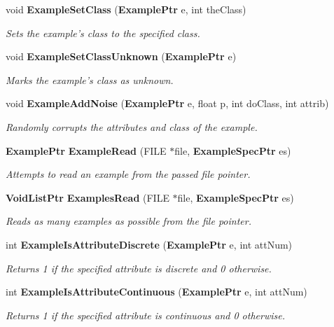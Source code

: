 \begin{CompactItemize}
void {\bf Example\-Set\-Class} ({\bf Example\-Ptr} e, int the\-Class)
\begin{CompactList}\small\item\em Sets the example's class to the specified class. \item\end{CompactList}\item 
void {\bf Example\-Set\-Class\-Unknown} ({\bf Example\-Ptr} e)
\begin{CompactList}\small\item\em Marks the example's class as unknown. \item\end{CompactList}\item 
void {\bf Example\-Add\-Noise} ({\bf Example\-Ptr} e, float p, int do\-Class, int attrib)
\begin{CompactList}\small\item\em Randomly corrupts the attributes and class of the example. \item\end{CompactList}\item 
{\bf Example\-Ptr} {\bf Example\-Read} (FILE $\ast$file, {\bf Example\-Spec\-Ptr} es)
\begin{CompactList}\small\item\em Attempts to read an example from the passed file pointer. \item\end{CompactList}\item 
{\bf Void\-List\-Ptr} {\bf Examples\-Read} (FILE $\ast$file, {\bf Example\-Spec\-Ptr} es)
\begin{CompactList}\small\item\em Reads as many examples as possible from the file pointer. \item\end{CompactList}\item 
int {\bf Example\-Is\-Attribute\-Discrete} ({\bf Example\-Ptr} e, int att\-Num)
\begin{CompactList}\small\item\em Returns 1 if the specified attribute is discrete and 0 otherwise. \item\end{CompactList}\item 
int {\bf Example\-Is\-Attribute\-Continuous} ({\bf Example\-Ptr} e, int att\-Num)
\begin{CompactList}\small\item\em Returns 1 if the specified attribute is continuous and 0 otherwise. \item\end{CompactList}\item 

\end{CompactItemize}
